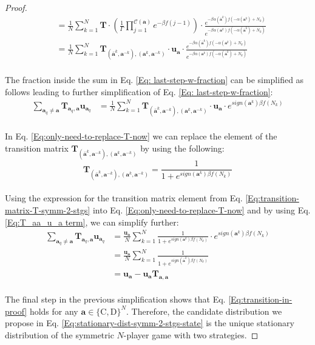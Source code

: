 \documentclass[11pt]{article}
\theoremstyle{plainCl1}
\theoremstyle{plainCl2}
\newcommand{\abf}{\mathbf{a}}
\newcommand{\T}{\mathbf{T}}
\newcommand{\ubf}{\mathbf{u}}
\newcommand{\C}{\mathrm{C}}
\newcommand{\D}{\mathrm{D}}
\begin{document}
\begin{proof}
\begin{align}
&= \frac{1}{N} \sum_{k=1}^N  \T \cdot \left( \frac{1}{\Gamma} \prod_{j=1}^{\mathcal{C}(\abf)} e^{-\beta f(j-1)}\right) \cdot \frac{e^{-\beta \alpha(\bar{\abf}^k)f(-\alpha(\abf^k)+ N_k)}}{e^{-\beta \alpha(\abf^k)f(-\alpha(\bar{\abf}^k) +N_k)}} \\[10pt]
&= \frac{1}{N} \sum_{k=1}^N  \T_{(\bar{\abf}^k, \abf^{-k}),(\abf^k, \abf^{-k})} \cdot \ubf_\abf \cdot \frac{e^{-\beta \alpha(\bar{\abf}^k)f(-\alpha(\abf^k)+ N_k)}}{e^{-\beta \alpha(\abf^k)f(-\alpha(\bar{\abf}^k) +N_k)}} \label{Eq: last-step-w-fraction} 
\end{align}
\\ \noindent The fraction inside the sum in  Eq. \ref{Eq: last-step-w-fraction} can be simplified as follows leading to further simplification of Eq. \ref{Eq: last-step-w-fraction}:
\begin{align}
\sum_{\abf_q \neq \abf} \T_{\abf_q, \abf} \ubf_{\abf_q} &= \frac{1}{N} \sum_{k=1}^N  \T_{(\bar{\abf}^k, \abf^{-k}),(\abf^k, \abf^{-k})} \cdot \ubf_\abf \cdot e^{sign(\abf^k) \beta f(N_k)} 
\label{Eq:only-need-to-replace-T-now}
\end{align}
\\ \noindent In Eq. \ref{Eq:only-need-to-replace-T-now} we can replace the element of the transition matrix $\T_{(\bar{\abf}^k, \abf^{-k}),(\abf^k, \abf^{-k})}$ by using the following: 
\begin{equation}
\T_{(\bar{\abf}^k, \abf^{-k}),(\abf^k, \abf^{-k})} = \frac{1}{1 + \displaystyle e^{\mathit{sign}(\abf^k) \beta f(N_k)}} 
\label{Eq:transition-matrix-T-symm-2-stgs}
\end{equation}
\\ \noindent Using the expression for the transition matrix element from Eq. \ref{Eq:transition-matrix-T-symm-2-stgs} into Eq. \ref{Eq:only-need-to-replace-T-now} and by using Eq. \ref{Eq:T_aa_u_a term}, we can simplify further: 
\begin{align}
\sum_{\abf_q \neq \abf} \T_{\abf_q, \abf} \ubf_{\abf_q} &= \frac{\ubf_\abf}{N} \sum_{k=1}^N \frac{1}{1 + \displaystyle e^{\mathit{sign}(\abf^k) \beta f(N_k)}} \cdot  e^{sign(\abf^k) \beta f(N_k)} \\[10pt]
&= \frac{\ubf_\abf}{N} \sum_{k=1}^N \frac{1}{1 + \displaystyle e^{\mathit{sign}(\bar{\abf}^k) \beta f(N_k)}}  \\[10pt]
&= \ubf_\abf - \ubf_\abf \T_{\abf,\abf}
\end{align}
\\ \noindent The final step in the previous simplification shows that Eq. \ref{Eq:transition-in-proof} holds for any $\abf \in \{\C,\D\}^N$. Therefore, the candidate distribution we propose in Eq. \ref{Eq:stationary-dist-symm-2-stgs-state} is the unique stationary distribution of the symmetric $N$-player game with two strategies. 
\end{proof}
\end{document}
